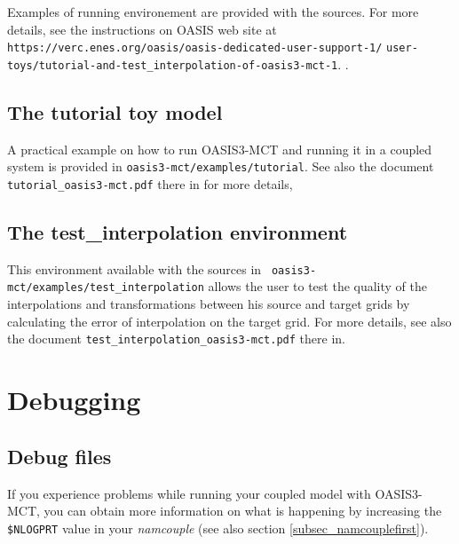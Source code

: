 Examples of running environement are provided with the sources. For
more details, see the instructions on OASIS web site at
{\tt https://verc.enes.org/oasis/oasis-dedicated-user-support-1/} {\tt user-toys/tutorial-and-test\_interpolation-of-oasis3-mct-1}.
.

\subsection{The tutorial toy model}
\label{subsec_tutorial}

A practical example on how to run OASIS3-MCT and running it in a
coupled system is provided in {\tt oasis3-mct/examples/tutorial}. See also the document {\tt tutorial\_oasis3-mct.pdf} there in for
more details,

\subsection{The test\_interpolation environment}
\label{subsec_testinterpolation}

This environment available with the sources in {\tt
  oasis3-mct/examples/test\_interpolation} allows the user to test the
quality of the interpolations and transformations between his source
and target grids by calculating the error of interpolation on the
target grid. For more details, see also the document {\tt test\_interpolation\_oasis3-mct.pdf} there in.

\section{Debugging}
\label{subsec_debug}

\subsection{Debug files}
If you experience problems while running your coupled model with
OASIS3-MCT, you can obtain more information on what is happening by
increasing the {\tt \$NLOGPRT} value in your {\it namcouple} (see also section
\ref{subsec_namcouplefirst}).

